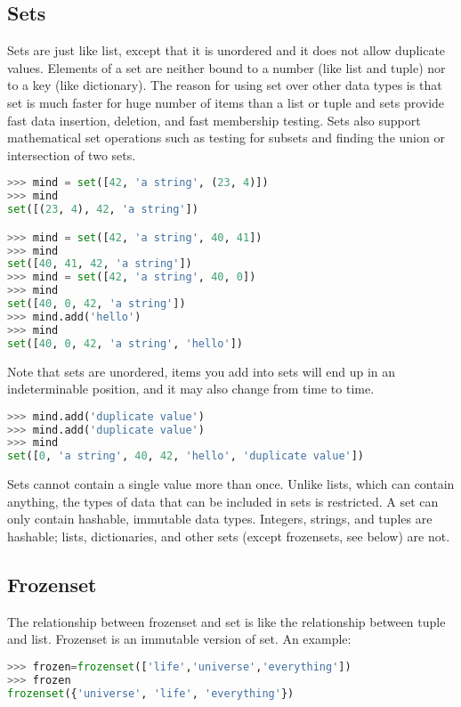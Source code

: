 \subsection{Sets}
Sets are just like list, except that it is unordered and it does not allow
duplicate values. Elements of a set are neither bound to a number (like list and
tuple) nor to a key (like dictionary). The reason for using set over other data
types is that set is much faster for huge number of items than a list or tuple
and sets provide fast data insertion, deletion, and fast membership testing.
Sets also support mathematical set operations such as testing for subsets and
finding the union or intersection of two sets.
\lstset{basicstyle=\scriptsize, numbers=left, captionpos=b, tabsize=4}
\begin{lstlisting}[caption=Set Definition,language={Python},
xleftmargin=15pt, label=lst:setdefinition]
>>> mind = set([42, 'a string', (23, 4)])
>>> mind
set([(23, 4), 42, 'a string'])

>>> mind = set([42, 'a string', 40, 41])
>>> mind
set([40, 41, 42, 'a string'])
>>> mind = set([42, 'a string', 40, 0])
>>> mind
set([40, 0, 42, 'a string'])
>>> mind.add('hello')
>>> mind
set([40, 0, 42, 'a string', 'hello'])
\end{lstlisting}

Note that sets are unordered, items you add into sets will end up in an
indeterminable position, and it may also change from time to time.
\lstset{basicstyle=\scriptsize, numbers=left, captionpos=b, tabsize=4}
\begin{lstlisting}[caption=Set Insert,language={Python},
xleftmargin=15pt, label=lst:setinsert]
>>> mind.add('duplicate value')
>>> mind.add('duplicate value')
>>> mind
set([0, 'a string', 40, 42, 'hello', 'duplicate value'])
\end{lstlisting}

Sets cannot contain a single value more than once. Unlike lists, which can
contain anything, the types of data that can be included in sets is restricted.
A set can only contain hashable, immutable data types. Integers, strings, and
tuples are hashable; lists, dictionaries, and other sets (except frozensets, see
below) are not.

\subsection{Frozenset}
The relationship between frozenset and set is like the relationship between
tuple and list. Frozenset is an immutable version of set. An example:
\lstset{basicstyle=\scriptsize, numbers=left, captionpos=b, tabsize=4}
\begin{lstlisting}[caption=Frozenset Definition,language={Python},
xleftmargin=15pt, label=lst:frozensetdefinition]
>>> frozen=frozenset(['life','universe','everything'])
>>> frozen
frozenset({'universe', 'life', 'everything'})
\end{lstlisting}

